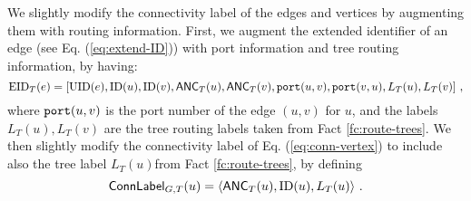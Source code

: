 We slightly modify the connectivity label of the edges and vertices by augmenting them with routing information. 
First, we augment the extended identifier of an edge (see Eq. (\ref{eq:extend-ID})) with port information and tree routing information, by having:
\begin{equation}\label{eq:edge-extended-routing}
\operatorname{EID}_T(e)=[\operatorname{UID}(e), \operatorname{ID}(u), \operatorname{ID}(v), \mathsf{ANC}_T(u), \mathsf{ANC}_T(v), \mbox{\tt port}(u,v), \mbox{\tt port}(v,u), L_T(u), L_T(v)]~,
\end{equation}
where $\mbox{\tt port}(u,v)$ is the port number of the edge $(u,v)$ for $u$, and the labels $L_T(u), L_T(v)$ are the tree routing labels taken from Fact \ref{fc:route-trees}. 
We then slightly modify the connectivity label of Eq. (\ref{eq:conn-vertex}) to include also the tree label $L_T(u)$from Fact \ref{fc:route-trees}, by defining 
\begin{equation}\label{eq:conn-vertex-label-routing}
\mathsf{ConnLabel}_{G,T}(u)=\langle \mathsf{ANC}_T(u), \operatorname{ID}(u), L_T(u)\rangle~.
\end{equation}

